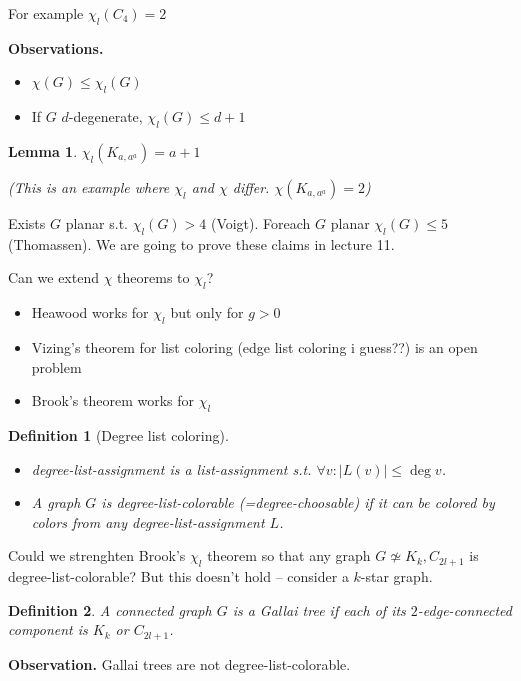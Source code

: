 \documentclass{article}
\newtheorem*{definition}{Definition}
\newtheorem*{lemma}{Lemma}
\begin{document}
\noindent
For example $\chi_l(C_4) = 2$

\noindent
\textbf{Observations.}
\begin{itemize}
	\item $\chi(G) \le \chi_l(G)$
	\item If $G$ $d$-degenerate, $\chi_l(G) \le d + 1$
\end{itemize}

\begin{lemma}
	$\chi_l(K_{a,a^a}) = a + 1$

	(This is an example where $\chi_l$ and $\chi$ differ. $\chi(K_{a,a^a})
	= 2$)
\end{lemma}

\noindent
Exists $G$ planar s.t. $\chi_l(G) > 4$ (Voigt). Foreach $G$ planar $\chi_l(G)
\le 5$ (Thomassen). We are going to prove these claims in lecture 11.

\noindent
Can we extend $\chi$ theorems to $\chi_l$?
\begin{itemize}
	\item Heawood works for $\chi_l$ but only for $g > 0$
	\item Vizing's theorem for list coloring (edge list coloring i guess??)
		is an open problem
	\item Brook's theorem works for $\chi_l$
\end{itemize}

\begin{definition}[Degree list coloring]
	~
	\begin{itemize}
		\item \emph{degree-list-assignment} is a list-assignment s.t.
			$\forall v: |L(v)| \le \deg v$.

		\item A graph $G$ is \emph{degree-list-colorable}
			(=degree-choosable) if it can be colored by colors from
			any degree-list-assignment $L$.
	\end{itemize}
\end{definition}

\noindent
Could we strenghten Brook's $\chi_l$ theorem so that any graph $G \not \simeq
K_k, C_{2l+1}$ is degree-list-colorable? But this doesn't hold -- consider a
$k$-star graph.

\begin{definition}
	A connected graph $G$ is a \emph{Gallai tree} if each of its
	$2$-edge-connected component is $K_k$ or $C_{2l+1}$.
\end{definition}

\noindent
\textbf{Observation.} Gallai trees are not degree-list-colorable.
\end{document}
